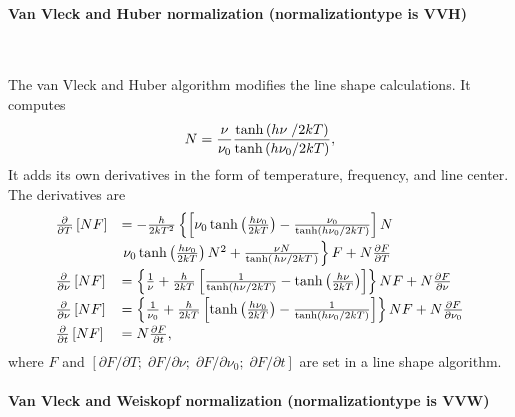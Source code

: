 \paragraph*{Van Vleck and Huber normalization (normalizationtype is VVH)} \

The van Vleck and Huber algorithm modifies the line shape calculations. It computes
\begin{equation}
 N = \frac{\nu}{\nu_0}\frac{\tanh \left( h\nu \; \middle/ 2kT \right)}{\tanh \left( h\nu_0 \middle/ 2kT \right)},
\end{equation}
It adds its own derivatives in the form of temperature, frequency, and line center.
The derivatives are
\begin{equation}
\begin{array}{ll}
 \frac{\partial}{\partial T} \left[NF\right] &= -\frac{h}{2kT^2} \left\{\left[\nu_0\tanh \left( \frac{h\nu_0} {2kT} \right)  - \frac{\nu_0}{\tanh \left( h\nu_0 \middle/ 2kT \right)}\right] N \right. \\[5pt] &\left. \nu_0 \tanh \left( \frac{h\nu_0}{2kT} \right) N^2 + \frac{\nu N}{\tanh \left( \left.{h\nu}\middle/{2kT}\right. \right)} \right\} F  + N\frac{\partial F}{\partial T}\\[5pt]
 \frac{\partial}{\partial \nu} \left[NF\right] &= \left\{\frac{1}{\nu} + \frac{h}{2kT}\left[\frac{1}{\tanh \left( {h\nu} \middle/ {2kT} \right)} - {\tanh \left( \frac{h\nu} {2kT} \right)}\right]\right\}NF  + N\frac{\partial F}{\partial \nu}\\[5pt]
 \frac{\partial}{\partial \nu} \left[NF\right] &= \left\{\frac{1}{\nu_0} + \frac{h}{2kT}\left[{\tanh \left( \frac{h\nu_0} {2kT} \right)} - \frac{1}{\tanh \left( {h\nu_0} \middle/ {2kT} \right)}\right]\right\}NF + N\frac{\partial F}{\partial \nu_0} \\[5pt]
 \frac{\partial}{\partial t} \left[NF\right] &= N\frac{\partial F}{\partial t},
\end{array}
\end{equation}
where $F$ and $[\partial F / \partial T;\; \partial F / \partial \nu;\; \partial F / \partial \nu_0;\; \partial F / \partial t]$ are set in a line shape algorithm.

\paragraph*{Van Vleck and Weiskopf normalization (normalizationtype is VVW)} \

